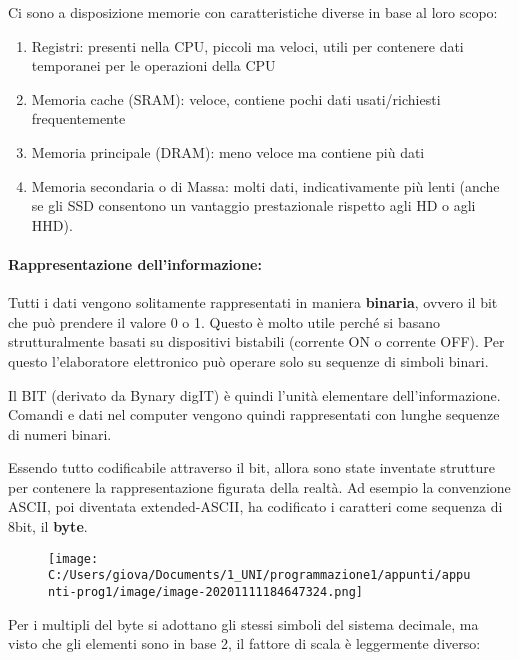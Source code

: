 \documentclass[
]{article}
\begin{document}
Ci sono a disposizione memorie con caratteristiche diverse in base al
loro scopo:

\begin{enumerate}
\def\labelenumi{\arabic{enumi}.}
\item
  Registri: presenti nella CPU, piccoli ma veloci, utili per contenere
  dati temporanei per le operazioni della CPU
\item
  Memoria cache (SRAM): veloce, contiene pochi dati usati/richiesti
  frequentemente
\item
  Memoria principale (DRAM): meno veloce ma contiene più dati
\item
  Memoria secondaria o di Massa: molti dati, indicativamente più lenti
  (anche se gli SSD consentono un vantaggio prestazionale rispetto agli
  HD o agli HHD).
\end{enumerate}

\hypertarget{header-n173}{%
\paragraph{Rappresentazione dell'informazione:}\label{header-n173}}

Tutti i dati vengono solitamente rappresentati in maniera
\textbf{binaria}, ovvero il bit che può prendere il valore 0 o 1. Questo
è molto utile perché si basano strutturalmente basati su dispositivi
bistabili (corrente ON o corrente OFF). Per questo l'elaboratore
elettronico può operare solo su sequenze di simboli binari.

Il BIT (derivato da Bynary digIT) è quindi l'unità elementare
dell'informazione. Comandi e dati nel computer vengono quindi
rappresentati con lunghe sequenze di numeri binari.

Essendo tutto codificabile attraverso il bit, allora sono state
inventate strutture per contenere la rappresentazione figurata della
realtà. Ad esempio la convenzione ASCII, poi diventata extended-ASCII,
ha codificato i caratteri come sequenza di 8bit, il \textbf{byte}.

\begin{figure}
\centering
\texttt{[image: C:/Users/giova/Documents/1\_UNI/programmazione1/appunti/appunti-prog1/image/image-20201111184647324.png]}
\caption{}
\end{figure}

Per i multipli del byte si adottano gli stessi simboli del sistema
decimale, ma visto che gli elementi sono in base 2, il fattore di scala
è leggermente diverso:
\end{document}
